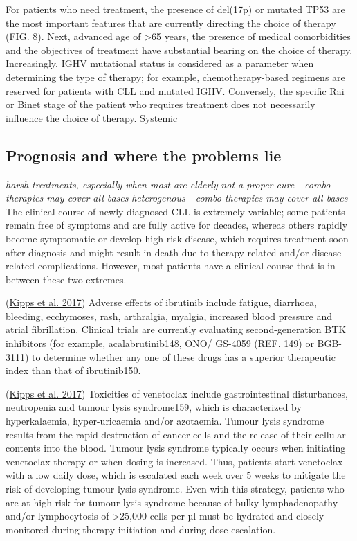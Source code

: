 \documentclass[11pt, a4paper, twosided]{book}
\begin{document}
For patients who need treatment, the presence of del(17p) or mutated TP53 are the most important features that are currently directing the choice of therapy (FIG. 8). Next, advanced age of \textgreater65 years, the presence of medical comorbidities and the objectives of treatment have substantial bearing on the choice of therapy. Increasingly, IGHV mutational status is considered as a parameter when determining the type of therapy; for example, chemotherapy-based regimens are reserved for patients with CLL and mutated IGHV. Conversely, the specific Rai or Binet stage of the patient who requires treatment does not necessarily influence the choice of therapy.
Systemic

\hypertarget{prognosis-and-where-the-problems-lie}{%
\subsection{Prognosis and where the problems lie}\label{prognosis-and-where-the-problems-lie}}

\emph{harsh treatments, especially when most are elderly}
\emph{not a proper cure - combo therapies may cover all bases}
\emph{heterogenous - combo therapies may cover all bases}
The clinical course of newly diagnosed CLL is extremely variable; some patients remain free of symptoms and are fully active for decades, whereas others rapidly become symptomatic or develop high-risk disease, which requires treatment soon after diagnosis and might result in death due to therapy-related and/or disease-related complications. However, most patients have a clinical course that is in between these two extremes.

(\protect\hyperlink{ref-Kipps2017}{Kipps et al. 2017})
Adverse effects of ibrutinib include fatigue, diarrhoea, bleeding, ecchymoses, rash, arthralgia, myalgia, increased blood pressure and atrial fibrillation. Clinical trials are currently evaluating second-generation BTK inhibitors (for example, acalabrutinib148, ONO/ GS-4059 (REF. 149) or BGB-3111) to determine whether any one of these drugs has a superior therapeutic index than that of ibrutinib150.

(\protect\hyperlink{ref-Kipps2017}{Kipps et al. 2017}) Toxicities of venetoclax include gastrointestinal disturbances, neutropenia and tumour lysis syndrome159, which is characterized by hyperkalaemia, hyper-uricaemia and/or azotaemia. Tumour lysis syndrome results from the rapid destruction of cancer cells and the release of their cellular contents into the blood. Tumour lysis syndrome typically occurs when initiating venetoclax therapy or when dosing is increased. Thus, patients start venetoclax with a low daily dose, which is escalated each week over 5 weeks to mitigate the risk of developing tumour lysis syndrome. Even with this strategy, patients who are at high risk for tumour lysis syndrome because of bulky lymphadenopathy and/or lymphocytosis of \textgreater25,000 cells per µl must be hydrated and closely monitored during therapy initiation and during dose escalation.
\end{document}
